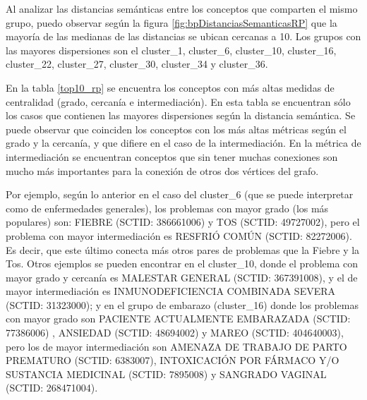 Al analizar las distancias semánticas entre los conceptos que comparten el mismo grupo, puedo observar según la figura \ref{fig:bpDistanciasSemanticasRP} que la mayoría de las medianas de las distancias se ubican cercanas a 10. Los grupos con las mayores dispersiones son el cluster\_1, cluster\_6, cluster\_10, cluster\_16, cluster\_22, cluster\_27, cluster\_30, cluster\_34 y cluster\_36. 

En la tabla \ref{top10_rp} se encuentra los conceptos con más altas medidas de  centralidad (grado, cercanía e intermediación). En esta tabla se encuentran sólo los casos que contienen las mayores dispersiones según la distancia semántica. Se puede observar que coinciden los conceptos con los más altas métricas según el grado y la cercanía, y que difiere en el caso de la intermediación. En la métrica de intermediación se encuentran conceptos que sin tener muchas conexiones son mucho más importantes para la conexión de otros dos vértices del grafo.

Por ejemplo, según lo anterior en el caso del cluster\_6 (que se puede interpretar como de enfermedades generales), los problemas con mayor grado (los más populares) son: FIEBRE (SCTID: 386661006) y TOS (SCTID: 49727002), pero el problema con mayor intermediación es RESFRIÓ COMÚN (SCTID: 82272006). Es decir, que este último conecta más otros pares de problemas que la Fiebre y la Tos. Otros ejemplos se pueden encontrar en el cluster\_10, donde el problema con mayor grado y cercanía es MALESTAR GENERAL (SCTID: 367391008), y el de mayor intermediación es INMUNODEFICIENCIA COMBINADA SEVERA (SCTID: 31323000); y en el grupo de embarazo (cluster\_16) donde los problemas con mayor grado son PACIENTE ACTUALMENTE EMBARAZADA (SCTID: 77386006) , ANSIEDAD (SCTID: 48694002) y MAREO (SCTID: 404640003), pero los de mayor intermediación son AMENAZA DE TRABAJO DE PARTO PREMATURO (SCTID: 6383007), INTOXICACIÓN POR FÁRMACO Y/O SUSTANCIA MEDICINAL (SCTID: 7895008) y SANGRADO VAGINAL (SCTID: 268471004).

